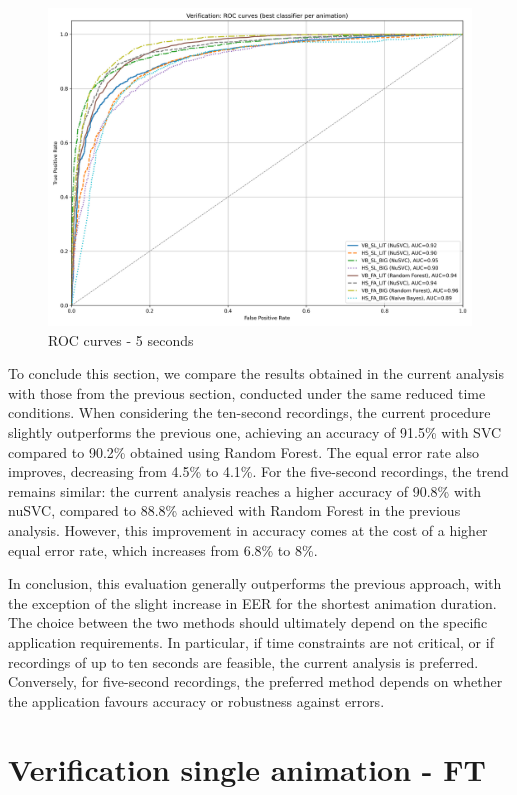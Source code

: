 \documentclass[12pt]{report}
\begin{document}
\begin{figure}[ht]
    \centering
    \includegraphics[width = 0.6
    \textwidth]{Images/Results/Classic_procedure/five_ten/st/five/Verification_single_roc_classic_five_st.png}
    \caption{ROC curves - 5 seconds}
    \label{fig:roc_cst_5}
\end{figure}

To conclude this section, we compare the results obtained in the current analysis with those from the previous section, conducted under the same reduced time conditions.
When considering the ten-second recordings, the current procedure slightly outperforms the previous one, achieving an accuracy of 91.5\% with SVC compared to 90.2\% obtained using Random Forest. 
The equal error rate also improves, decreasing from 4.5\% to 4.1\%.
For the five-second recordings, the trend remains similar: the current analysis reaches a higher accuracy of 90.8\% with nuSVC, compared to 88.8\% achieved with Random Forest in the previous analysis. 
However, this improvement in accuracy comes at the cost of a higher equal error rate, which increases from 6.8\% to 8\%.

In conclusion, this evaluation generally outperforms the previous approach, with the exception of the slight increase in EER for the shortest animation duration.
The choice between the two methods should ultimately depend on the specific application requirements. 
In particular, if time constraints are not critical, or if recordings of up to ten seconds are feasible, the current analysis is preferred. 
Conversely, for five-second recordings, the preferred method depends on whether the application favours accuracy or robustness against errors.
\FloatBarrier

\section{Verification single animation - FT}
\label{subsec:terza_ver}
\end{document}

